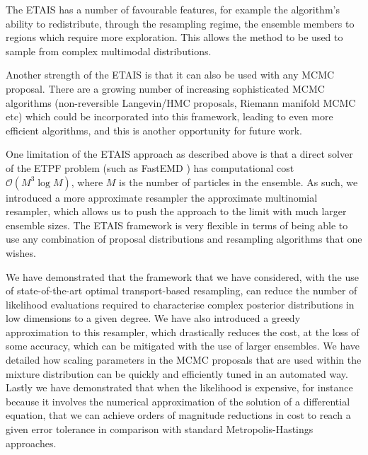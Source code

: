\documentclass[final]{siamltex}
\begin{document}

The ETAIS has a number of favourable features, for example the
algorithm's ability to redistribute, through the resampling regime,
the ensemble members to regions which require more exploration. This allows the
method to be used to sample from complex multimodal distributions.

Another strength of the ETAIS is that it can also be used with any MCMC
proposal. There are a growing number of increasing sophisticated MCMC
algorithms (non-reversible Langevin/HMC proposals, Riemann manifold MCMC etc) which could be
incorporated into this framework, leading to even more efficient
algorithms, and this is another opportunity for future work. 

One limitation of the ETAIS approach as described above is that a
direct solver of the ETPF problem (such as FastEMD \cite{FastEMD}) has computational cost
$\mathcal{O}(M^3\log M)$, where $M$ is the number of particles in the
ensemble. As such, we introduced a more approximate resampler the
approximate multinomial resampler, which allows us to push the
approach to the limit
with much larger ensemble sizes. The ETAIS framework is very flexible
in terms of being able to use any combination of proposal
distributions and resampling algorithms that one wishes.

We have demonstrated that the framework that we have considered, with
the use of state-of-the-art optimal transport-based resampling, can
reduce the number of likelihood evaluations required to characterise
complex posterior distributions in low dimensions to a given
degree. We have also introduced a greedy approximation to this
resampler, which drastically reduces the cost, at the loss of some
accuracy, which can be mitigated with the use of larger
ensembles. We have detailed how scaling parameters in the MCMC
proposals that are used within the mixture distribution can be quickly
and efficiently
tuned in an automated way. Lastly we have demonstrated that when the
likelihood is expensive, for instance because it involves the
numerical approximation of the solution of a differential equation, {\red
that we can achieve orders of magnitude reductions in cost to reach a
given error tolerance in comparison with standard Metropolis-Hastings approaches.}
\end{document}
